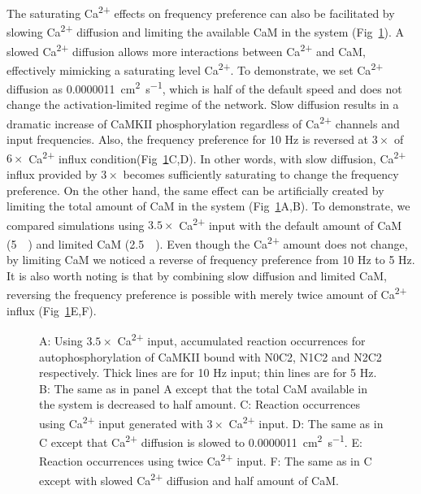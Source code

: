 \documentclass[10pt,letterpaper]{article}
\begin{document}
The saturating Ca\textsuperscript{2+} effects on frequency preference can also be facilitated by slowing Ca\textsuperscript{2+} diffusion and limiting the available CaM in the system (Fig~\ref{fig7}). A slowed Ca\textsuperscript{2+} diffusion allows more interactions between Ca\textsuperscript{2+} and CaM, effectively mimicking a saturating level Ca\textsuperscript{2+}. To demonstrate, we set Ca\textsuperscript{2+} diffusion as \SI{0.0000011}{\square\cm\per\s}, which is half of the default speed and does not change the activation-limited regime of the network. Slow diffusion results in a dramatic increase of CaMKII phosphorylation regardless of Ca\textsuperscript{2+} channels and input frequencies. Also, the frequency preference for 10 Hz is reversed at $3\times$ of $6\times$ Ca\textsuperscript{2+} influx condition(Fig~\ref{fig7}C,D). In other words, with slow diffusion, Ca\textsuperscript{2+} influx provided by $3\times$ becomes sufficiently saturating to change the frequency preference. On the other hand, the same effect can be artificially created by limiting the total amount of CaM in the system (Fig~\ref{fig7}A,B). To demonstrate, we compared simulations using $3.5\times$ Ca\textsuperscript{2+} input with the default amount of CaM (\SI{5}{\micro\Molar}) and limited CaM (\SI{2.5}{\micro\Molar}). Even though the Ca\textsuperscript{2+} amount does not change, by limiting CaM we noticed a reverse of frequency preference from 10 Hz to 5 Hz. It is also worth noting is that by combining slow diffusion and limited CaM, reversing the frequency preference is possible with merely twice amount of Ca\textsuperscript{2+} influx (Fig~\ref{fig7}E,F). 

\begin{figure}[!h]
	\caption{{\bf}
	A: Using $3.5\times$ Ca\textsuperscript{2+} input, accumulated reaction occurrences for autophosphorylation of CaMKII bound with N0C2, N1C2 and N2C2 respectively. Thick lines are for 10 Hz input; thin lines are for 5 Hz. B: The same as in panel A except that the total CaM available in the system is decreased to half amount. C: Reaction occurrences using Ca\textsuperscript{2+} input generated with $3\times$ Ca\textsuperscript{2+} input. D: The same as in C except that Ca\textsuperscript{2+} diffusion is slowed  to \SI{0.0000011}{\square\cm\per\s}. E: Reaction occurrences using twice Ca\textsuperscript{2+} input. F: The same as in C except with slowed Ca\textsuperscript{2+} diffusion and half amount of CaM.}
\label{fig7}
\end{figure}
\end{document}
